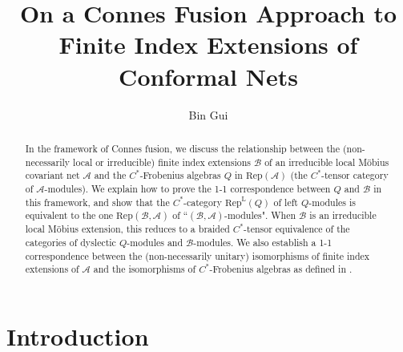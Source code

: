 \documentclass[11pt,b5paper,notitlepage]{article}
\title{On a Connes Fusion Approach to Finite Index Extensions of Conformal Nets}
\author{{\sc Bin Gui}
}
\date{}
\theoremstyle{definition}
\theoremstyle{plain}
\newcommand{\mc}{\mathcal}
\newcommand{\Rep}{\mathrm{Rep}}
\newcommand{\RepA}{\mathrm{Rep}(\mathcal A)}
\newcommand{\RepL}{\mathrm{Rep}^{\mathrm{L}}}
\numberwithin{equation}{section}
\begin{document}
\sloppy %
	\setcounter{section}{-1}
	
	
	
	\maketitle
	
	
\newcommand\blfootnote[1]{%
	\begingroup
	\renewcommand\thefootnote{}\footnote{#1}%
	\addtocounter{footnote}{-1}%
	\endgroup
}



\begin{abstract}
In the framework of Connes fusion, we discuss the relationship between the  (non-necessarily local or irreducible) finite index extensions $\mc B$ of an irreducible local M\"obius covariant net $\mc A$ and the $C^*$-Frobenius algebras $Q$ in $\RepA$ (the $C^*$-tensor category  of  $\mc A$-modules). We explain how to prove the 1-1 correspondence between $Q$ and $\mc B$ in this framework, and show that the $C^*$-category $\RepL(Q)$ of left $Q$-modules is equivalent to the one $\Rep(\mc B,\mc A)$ of ``$(\mc B,\mc A)$-modules". When $\mc B$ is an irreducible local M\"obius extension, this reduces to a braided $C^*$-tensor equivalence of the categories of dyslectic $Q$-modules and $\mc B$-modules. We also establish a 1-1 correspondence between the (non-necessarily unitary)  isomorphisms of finite index extensions of $\mc A$ and the isomorphisms of $C^*$-Frobenius algebras as defined in \cite{NY18}.
\end{abstract}


\tableofcontents




	


\section{Introduction}
\end{document}
